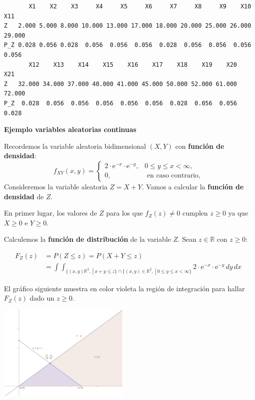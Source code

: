 \documentclass[
  letterpaper,
  DIV=11,
  numbers=noendperiod]{scrreprt}
\begin{document}
\begin{verbatim}
       X1    X2    X3     X4     X5     X6     X7     X8     X9    X10    X11
Z   2.000 5.000 8.000 10.000 13.000 17.000 18.000 20.000 25.000 26.000 29.000
P_Z 0.028 0.056 0.028  0.056  0.056  0.056  0.028  0.056  0.056  0.056  0.056
       X12    X13    X14    X15    X16    X17    X18    X19    X20    X21
Z   32.000 34.000 37.000 40.000 41.000 45.000 50.000 52.000 61.000 72.000
P_Z  0.028  0.056  0.056  0.056  0.056  0.056  0.028  0.056  0.056  0.028
\end{verbatim}

\textbf{Ejemplo variables aleatorias continuas}

Recordemos la variable aleatoria bidimensional \((X,Y)\) con
\textbf{función de densidad}: \[
f_{XY}(x,y)=\begin{cases}
2\cdot  \mathrm{e}^{-x}\cdot \mathrm{e}^{-y}, & 0\leq y\leq x < \infty,\\
0, & \mbox{ en caso contrario,}
\end{cases}
\] Consideremos la variable aleatoria \(Z=X+Y\). Vamos a calcular la
\textbf{función de densidad} de \(Z\).

En primer lugar, los valores de \(Z\) para los que \(f_Z(z)\neq 0\)
cumplen \(z\geq 0\) ya que \(X\geq 0\) e \(Y\geq 0\).

Calculemos la \textbf{función de distribución} de la variable \(Z\).
Sean \(z\in\mathbb{R}\) con \(z\geq 0\):

\[
\begin{array}{rl}
F_Z(z) & =  P(Z\leq z)=P(X+Y\leq z)\\
& =\displaystyle \int\int_{\{(x,y)\mathbb{R}^2,\ |\ x+y\leq z\}\cap \{(x,y)\in \mathbb{R}^2,\ |\ 0\leq y\leq x<\infty\}} 2\cdot  \mathrm{e}^{-x}\cdot \mathrm{e}^{-y}\, dy\, dx
\end{array}
\]

El gráfico siguiente muestra en color violeta la región de integración
para hallar \(F_Z(z)\) dado un \(z\geq 0\).

\includegraphics[width=2.5in,height=\textheight]{Images/EjSumaXY.png}
\end{document}
